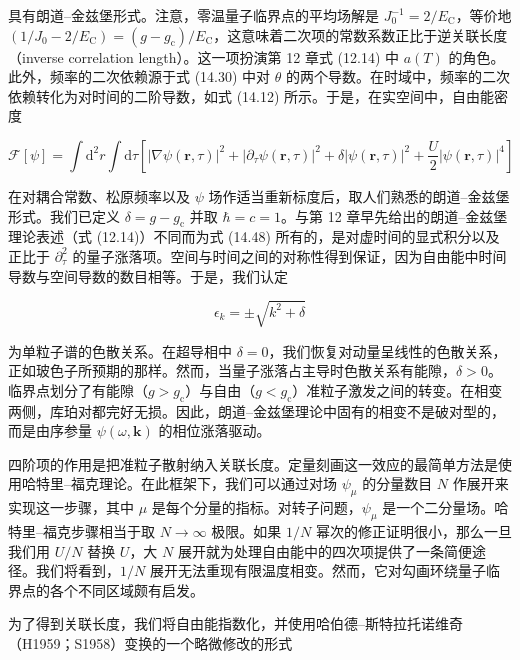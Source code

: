 具有朗道–金兹堡形式。注意，零温量子临界点的平均场解是 $J_0^{-1}=2/E_{\mathrm{C}}$，等价地 $(1/J_0-2/E_{\mathrm{C}})=(g-g_{\mathrm{c}})/E_{\mathrm{C}}$，这意味着二次项的常数系数正比于逆关联长度（inverse correlation length）。这一项扮演第 12 章式 (12.14) 中 $a(T)$ 的角色。此外，频率的二次依赖源于式 (14.30) 中对 $\theta$ 的两个导数。在时域中，频率的二次依赖转化为对时间的二阶导数，如式 (14.12) 所示。于是，在实空间中，自由能密度

\begin{equation*}
\mathcal{F}[\psi] = \int \mathrm{d}^2r \int \mathrm{d}\tau \left[ |\nabla\psi(\mathbf{r},\tau)|^2 + |\partial_{\tau}\psi(\mathbf{r},\tau)|^2 + \delta|\psi(\mathbf{r},\tau)|^2 + \frac{U}{2}|\psi(\mathbf{r},\tau)|^4 \right]\tag{14.48}
\end{equation*}

在对耦合常数、松原频率以及 $\psi$ 场作适当重新标度后，取人们熟悉的朗道–金兹堡形式。我们已定义 $\delta=g-g_{\mathrm{c}}$ 并取 $\hbar=c=1$。与第 12 章早先给出的朗道–金兹堡理论表述（式 (12.14)）不同而为式 (14.48) 所有的，是对虚时间的显式积分以及正比于 $\partial_{\tau}^2$ 的量子涨落项。空间与时间之间的对称性得到保证，因为自由能中时间导数与空间导数的数目相等。于是，我们认定

\begin{equation*}
\epsilon_k = \pm\sqrt{k^2+\delta}\tag{14.49}
\end{equation*}

为单粒子谱的色散关系。在超导相中 $\delta=0$，我们恢复对动量呈线性的色散关系，正如玻色子所预期的那样。然而，当量子涨落占主导时色散关系有能隙，$\delta>0$。临界点划分了有能隙（$g>g_{\mathrm{c}}$）与自由（$g<g_{\mathrm{c}}$）准粒子激发之间的转变。在相变两侧，库珀对都完好无损。因此，朗道–金兹堡理论中固有的相变不是破对型的，而是由序参量 $\psi(\omega,\mathbf{k})$ 的相位涨落驱动。

四阶项的作用是把准粒子散射纳入关联长度。定量刻画这一效应的最简单方法是使用哈特里–福克理论。在此框架下，我们可以通过对场 $\psi_{\mu}$ 的分量数目 $N$ 作展开来实现这一步骤，其中 $\mu$ 是每个分量的指标。对转子问题，$\psi_{\mu}$ 是一个二分量场。哈特里–福克步骤相当于取 $N\rightarrow\infty$ 极限。如果 $1/N$ 幂次的修正证明很小，那么一旦我们用 $U/N$ 替换 $U$，大 $N$ 展开就为处理自由能中的四次项提供了一条简便途径。我们将看到，$1/N$ 展开无法重现有限温度相变。然而，它对勾画环绕量子临界点的各个不同区域颇有启发。

为了得到关联长度，我们将自由能指数化，并使用哈伯德–斯特拉托诺维奇（H1959；S1958）变换的一个略微修改的形式

